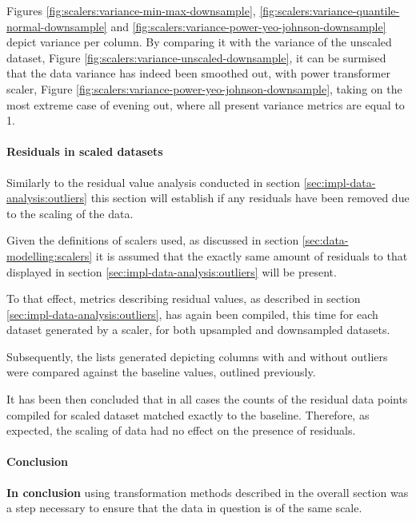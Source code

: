 Figures \ref{fig:scalers:variance-min-max-downsample}, \ref{fig:scalers:variance-quantile-normal-downsample} and \ref{fig:scalers:variance-power-yeo-johnson-downsample} depict variance per column. By comparing it with the variance of the unscaled dataset, Figure \ref{fig:scalers:variance-unscaled-downsample}, it can be surmised that the data variance has indeed been smoothed out, with power transformer scaler, Figure \ref{fig:scalers:variance-power-yeo-johnson-downsample}, taking on the most extreme case of evening out, where all present variance metrics are equal to 1.
\FloatBarrier

\paragraph{Residuals in scaled datasets}\label{sec:scalers:outliers}
Similarly to the residual value analysis conducted in section \ref{sec:impl-data-analysis:outliers} this section will establish if any residuals have been removed due to the scaling of the data. 

Given the definitions of scalers used, as discussed in section \ref{sec:data-modelling:scalers} it is assumed that the exactly same amount of residuals to that displayed in section \ref{sec:impl-data-analysis:outliers} will be present. 

To that effect, metrics describing residual values, as described in section \ref{sec:impl-data-analysis:outliers}, has again been compiled, this time for each dataset generated by a scaler, for both upsampled and downsampled datasets.

Subsequently, the lists generated depicting columns with and without outliers were compared against the baseline values, outlined previously. 

It has been then concluded that in all cases the counts of the residual data points compiled for scaled dataset matched exactly to the baseline. Therefore, as expected, the scaling of data had no effect on the presence of residuals.

\paragraph{Conclusion}\label{sec:scalers:conclusion}
\textbf{In conclusion} using transformation methods described in the overall section was a step necessary to ensure that the data in question is of the same scale. 

\FloatBarrier
